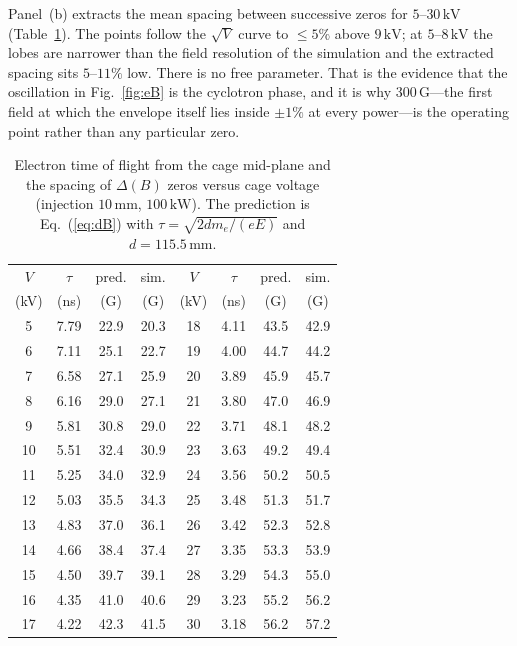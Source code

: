 \documentclass[hyperref]{cernrep}
\begin{document}
Panel~(b) extracts the mean spacing between successive zeros for
$5$--$30\,\mathrm{kV}$ (Table~\ref{tab:cyc}). The points follow the
$\sqrt{V}$ curve to $\le 5\%$ above $9\,\mathrm{kV}$; at
$5$--$8\,\mathrm{kV}$ the lobes are narrower than the field
resolution of the simulation and the extracted spacing sits
$5$--$11\%$ low. There is no free parameter. That is the evidence
that the oscillation in Fig.~\ref{fig:eB} is the cyclotron phase, and
it is why
$300\,\mathrm{G}$---the first field at which the envelope itself lies
inside $\pm 1\%$ at every power---is the operating point rather than
any particular zero.

\begin{table}[htbp]
\centering
\caption{Electron time of flight from the cage mid-plane and the
spacing of $\Delta(B)$ zeros versus cage voltage (injection
$10\,\mathrm{mm}$, $100\,\mathrm{kW}$). The prediction is
Eq.~(\ref{eq:dB}) with $\tau=\sqrt{2 d m_e/(eE)}$ and
$d=115.5\,\mathrm{mm}$.}
\label{tab:cyc}
{\footnotesize\setlength{\tabcolsep}{3.5pt}
\begin{tabular}{cccc@{\hspace{1.6em}}cccc}
\hline\hline
$V$ & $\tau$ & pred. & sim. &
$V$ & $\tau$ & pred. & sim. \\
(kV) & (ns) & (G) & (G) &
(kV) & (ns) & (G) & (G) \\
\hline
5 & 7.79 & 22.9 & 20.3 & 18 & 4.11 & 43.5 & 42.9 \\
6 & 7.11 & 25.1 & 22.7 & 19 & 4.00 & 44.7 & 44.2 \\
7 & 6.58 & 27.1 & 25.9 & 20 & 3.89 & 45.9 & 45.7 \\
8 & 6.16 & 29.0 & 27.1 & 21 & 3.80 & 47.0 & 46.9 \\
9 & 5.81 & 30.8 & 29.0 & 22 & 3.71 & 48.1 & 48.2 \\
10 & 5.51 & 32.4 & 30.9 & 23 & 3.63 & 49.2 & 49.4 \\
11 & 5.25 & 34.0 & 32.9 & 24 & 3.56 & 50.2 & 50.5 \\
12 & 5.03 & 35.5 & 34.3 & 25 & 3.48 & 51.3 & 51.7 \\
13 & 4.83 & 37.0 & 36.1 & 26 & 3.42 & 52.3 & 52.8 \\
14 & 4.66 & 38.4 & 37.4 & 27 & 3.35 & 53.3 & 53.9 \\
15 & 4.50 & 39.7 & 39.1 & 28 & 3.29 & 54.3 & 55.0 \\
16 & 4.35 & 41.0 & 40.6 & 29 & 3.23 & 55.2 & 56.2 \\
17 & 4.22 & 42.3 & 41.5 & 30 & 3.18 & 56.2 & 57.2 \\
\hline\hline
\end{tabular}
}
\end{table}
\end{document}
